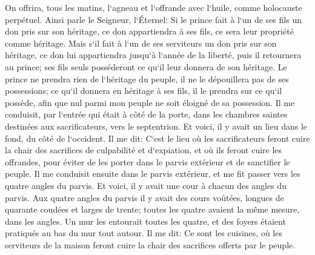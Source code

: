 \verse On offrira, tous les matins, l`agneau et l`offrande avec l`huile, comme holocauste perpétuel. 
\verse Ainsi parle le Seigneur, l`Éternel: Si le prince fait à l`un de ses fils un don pris sur son héritage, ce don appartiendra à ses fils, ce sera leur propriété comme héritage. 
\verse Mais s`il fait à l`un de ses serviteurs un don pris sur son héritage, ce don lui appartiendra jusqu`à l`année de la liberté, puis il retournera au prince; ses fils seuls posséderont ce qu`il leur donnera de son héritage. 
\verse Le prince ne prendra rien de l`héritage du peuple, il ne le dépouillera pas de ses possessions; ce qu`il donnera en héritage à ses fils, il le prendra sur ce qu`il possède, afin que nul parmi mon peuple ne soit éloigné de sa possession. 
\verse Il me conduisit, par l`entrée qui était à côté de la porte, dans les chambres saintes destinées aux sacrificateurs, vers le septentrion. Et voici, il y avait un lieu dans le fond, du côté de l`occident. 
\verse Il me dit: C`est le lieu où les sacrificateurs feront cuire la chair des sacrifices de culpabilité et d`expiation, et où ils feront cuire les offrandes, pour éviter de les porter dans le parvis extérieur et de sanctifier le peuple. 
\verse Il me conduisit ensuite dans le parvis extérieur, et me fit passer vers les quatre angles du parvis. Et voici, il y avait une cour à chacun des angles du parvis. 
\verse Aux quatre angles du parvis il y avait des cours voûtées, longues de quarante coudées et larges de trente; toutes les quatre avaient la même mesure, dans les angles. 
\verse Un mur les entourait toutes les quatre, et des foyers étaient pratiqués au bas du mur tout autour. 
\verse Il me dit: Ce sont les cuisines, où les serviteurs de la maison feront cuire la chair des sacrifices offerts par le peuple. 

\chapter{}

